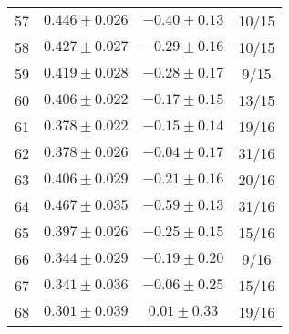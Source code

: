 \begin{tabular}{c|c|c|c}
57 & $0.446\pm0.026$ & $-0.40\pm0.13$ & 10/15 \\
58 & $0.427\pm0.027$ & $-0.29\pm0.16$ & 10/15 \\
59 & $0.419\pm0.028$ & $-0.28\pm0.17$ & 9/15 \\
60 & $0.406\pm0.022$ & $-0.17\pm0.15$ & 13/15 \\
61 & $0.378\pm0.022$ & $-0.15\pm0.14$ & 19/16 \\
62 & $0.378\pm0.026$ & $-0.04\pm0.17$ & 31/16 \\
63 & $0.406\pm0.029$ & $-0.21\pm0.16$ & 20/16 \\
64 & $0.467\pm0.035$ & $-0.59\pm0.13$ & 31/16 \\
65 & $0.397\pm0.026$ & $-0.25\pm0.15$ & 15/16 \\
66 & $0.344\pm0.029$ & $-0.19\pm0.20$ & 9/16 \\
67 & $0.341\pm0.036$ & $-0.06\pm0.25$ & 15/16 \\
68 & $0.301\pm0.039$ & $0.01\pm0.33$ & 19/16 \\
\end{tabular}
